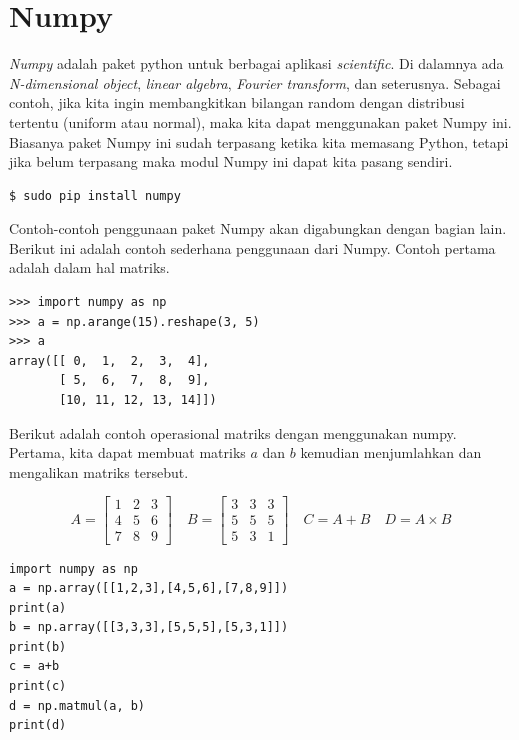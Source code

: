 \section{Numpy}
{\em Numpy} adalah paket python untuk berbagai aplikasi {\em scientific}.
Di dalamnya ada {\em N-dimensional object}, {\em linear algebra},
{\em Fourier transform}, dan seterusnya.
Sebagai contoh, jika kita ingin membangkitkan bilangan random dengan 
distribusi tertentu (uniform atau normal), maka kita dapat menggunakan 
paket Numpy ini.
Biasanya paket Numpy ini sudah terpasang ketika kita memasang Python,
tetapi jika belum terpasang maka modul Numpy ini dapat kita pasang sendiri.

\begin{verbatim}
$ sudo pip install numpy
\end{verbatim}

Contoh-contoh penggunaan paket Numpy akan digabungkan dengan bagian lain.
Berikut ini adalah contoh sederhana penggunaan dari Numpy.
Contoh pertama adalah dalam hal matriks.

\begin{verbatim}
>>> import numpy as np
>>> a = np.arange(15).reshape(3, 5)
>>> a
array([[ 0,  1,  2,  3,  4],
       [ 5,  6,  7,  8,  9],
       [10, 11, 12, 13, 14]])
\end{verbatim}

Berikut adalah contoh operasional matriks dengan menggunakan numpy.
Pertama, kita dapat membuat matriks $a$ dan $b$ kemudian menjumlahkan
dan mengalikan matriks tersebut.

\begin{equation*}
   A = 
   \begin{bmatrix}
   1 & 2 & 3 \\
   4 & 5 & 6 \\
   7 & 8 & 9
   \end{bmatrix}
   \quad
   B =
   \begin{bmatrix}
   3 & 3 & 3 \\
   5 & 5 & 5 \\
   5 & 3 & 1
   \end{bmatrix}
   \quad
   C = A+B
   \quad
   D = A \times B
\end{equation*}


\begin{verbatim}
import numpy as np
a = np.array([[1,2,3],[4,5,6],[7,8,9]])
print(a)
b = np.array([[3,3,3],[5,5,5],[5,3,1]])
print(b)
c = a+b
print(c)
d = np.matmul(a, b)
print(d)
\end{verbatim}


